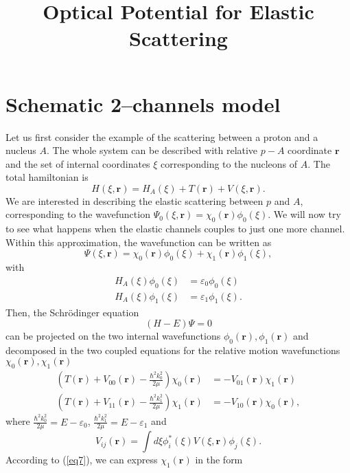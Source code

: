 \documentclass[a4paper,11pt]{article}
\title{Optical Potential for Elastic Scattering}
\begin{document}
\maketitle
\section{Schematic 2--channels model}
Let us first consider the example of the scattering between a proton and a nucleus $A$. The whole system can be described with relative $p-A$ coordinate $\mathbf{r}$ and the set of internal coordinates $\xi$ corresponding to the nucleons of $A$. The total hamiltonian is
\begin{equation}\label{eq1}
H(\xi,\mathbf{r})=H_{A}(\xi)+T(\mathbf{r})+V(\xi,\mathbf{r}).
\end{equation}
We are interested in describing  the elastic scattering between $p$ and $A$, corresponding to the wavefunction $\Psi_0(\xi,\mathbf{r})=\chi_0(\mathbf{r})\phi_0(\xi)$.
We will now try to see what happens when the elastic channels couples to just one more channel. Within this approximation, the wavefunction can be written as
\begin{equation}\label{eq2}
\Psi(\xi,\mathbf{r})=\chi_0(\mathbf{r})\phi_0(\xi)+\chi_1(\mathbf{r})\phi_1(\xi),
\end{equation}
with
\begin{eqnarray}\label{eq3}
\nonumber H_A(\xi)\phi_0(\xi)&=\varepsilon_0\phi_0(\xi)\\
H_A(\xi)\phi_1(\xi)&=\varepsilon_1\phi_1(\xi).
\end{eqnarray}
Then, the Schr\"{o}dinger equation
\begin{equation}\label{eq4}
(H-E)\Psi=0
\end{equation}
can be projected on the two internal wavefunctions $\phi_0(\mathbf{r}),\phi_1(\mathbf{r})$ and decomposed in the two coupled equations for the relative motion wavefunctions $\chi_0(\mathbf{r}),\chi_1(\mathbf{r})$
\begin{eqnarray}\label{eq5}
\nonumber \label{eq12}\left(T(\mathbf{r})+V_{00}(\mathbf{r})-\frac{\hbar^2k_0^2}{2 \mu}\right)\chi_0(\mathbf{r})&=-V_{01}(\mathbf{r})\chi_1(\mathbf{r})\\
\label{eq7} \left(T(\mathbf{r})+V_{11}(\mathbf{r})-\frac{\hbar^2k_1^2}{2 \mu}\right)\chi_1(\mathbf{r})&=-V_{10}(\mathbf{r})\chi_0(\mathbf{r}),
\end{eqnarray}
where $\tfrac{\hbar^2k_0^2}{2 \mu}=E-\varepsilon_0$, $\tfrac{\hbar^2k_1^2}{2 \mu}=E-\varepsilon_1$ and
\begin{equation}\label{eq6}
V_{ij}(\mathbf{r})=\int d\xi \phi^*_i(\xi)V(\xi,\mathbf{r})\phi_j(\xi).
\end{equation}
According to (\ref{eq7}), we can express $\chi_1(\mathbf{r})$ in the form
\end{document}
